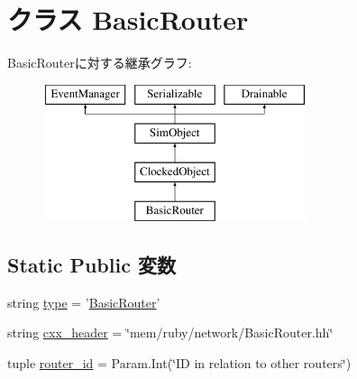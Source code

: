 \hypertarget{classBasicRouter_1_1BasicRouter}{
\section{クラス BasicRouter}
\label{classBasicRouter_1_1BasicRouter}
}
BasicRouterに対する継承グラフ:\begin{figure}[H]
\begin{center}
\leavevmode
\includegraphics[height=4cm]{classBasicRouter_1_1BasicRouter}
\end{center}
\end{figure}
\subsection*{Static Public 変数}
\begin{DoxyCompactItemize}
\item 
string \hyperlink{classBasicRouter_1_1BasicRouter_acce15679d830831b0bbe8ebc2a60b2ca}{type} = '\hyperlink{classBasicRouter_1_1BasicRouter}{BasicRouter}'
\item 
string \hyperlink{classBasicRouter_1_1BasicRouter_a17da7064bc5c518791f0c891eff05fda}{cxx\_\-header} = \char`\"{}mem/ruby/network/BasicRouter.hh\char`\"{}
\item 
tuple \hyperlink{classBasicRouter_1_1BasicRouter_ad868106a54f225398ffb41970f0b6b99}{router\_\-id} = Param.Int(\char`\"{}ID in relation to other routers\char`\"{})
\end{DoxyCompactItemize}


